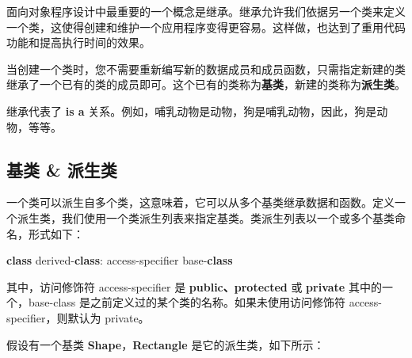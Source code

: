 \documentclass[
]{article}
\newenvironment{Shaded}{}{}
\newcommand{\KeywordTok}[1]{\textcolor[rgb]{0.00,0.44,0.13}{\textbf{#1}}}
\newcommand{\NormalTok}[1]{#1}
\newcommand{\OperatorTok}[1]{\textcolor[rgb]{0.40,0.40,0.40}{#1}}
\begin{document}
面向对象程序设计中最重要的一个概念是继承。继承允许我们依据另一个类来定义一个类，这使得创建和维护一个应用程序变得更容易。这样做，也达到了重用代码功能和提高执行时间的效果。

当创建一个类时，您不需要重新编写新的数据成员和成员函数，只需指定新建的类继承了一个已有的类的成员即可。这个已有的类称为\textbf{基类}，新建的类称为\textbf{派生类}。

继承代表了 \textbf{is a}
关系。例如，哺乳动物是动物，狗是哺乳动物，因此，狗是动物，等等。

\hypertarget{ux57faux7c7b-ux6d3eux751fux7c7b}{%
\subsection{基类 \& 派生类}\label{ux57faux7c7b-ux6d3eux751fux7c7b}}

一个类可以派生自多个类，这意味着，它可以从多个基类继承数据和函数。定义一个派生类，我们使用一个类派生列表来指定基类。类派生列表以一个或多个基类命名，形式如下：

\begin{Shaded}
\begin{Highlighting}[]
\KeywordTok{class}\NormalTok{ derived}\OperatorTok{{-}}\KeywordTok{class}\OperatorTok{:}\NormalTok{ access}\OperatorTok{{-}}\NormalTok{specifier base}\OperatorTok{{-}}\KeywordTok{class}
\end{Highlighting}
\end{Shaded}

其中，访问修饰符 access-specifier 是 \textbf{public、protected} 或
\textbf{private} 其中的一个，base-class
是之前定义过的某个类的名称。如果未使用访问修饰符
access-specifier，则默认为 private。

假设有一个基类 \textbf{Shape}，\textbf{Rectangle}
是它的派生类，如下所示：
\end{document}
